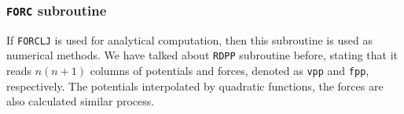 
\subsubsection{\texttt{FORC} subroutine}
\label{sssec:forc}

If \texttt{FORCLJ} is used for analytical computation, then this subroutine is
used as numerical methods.
We have talked about \texttt{RDPP} subroutine before, stating that it reads
$n (n+1)$ columns of potentials and forces, denoted as \texttt{vpp} and
\texttt{fpp}, respectively.
The potentials interpolated by quadratic functions, the forces are also
calculated similar process.
